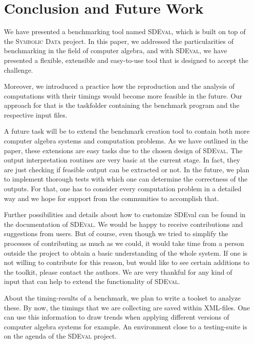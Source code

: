 \documentclass[oribibl,11pt]{article}
\begin{document}
\section{Conclusion and Future Work}
\label{sctn:Conclusion}

We have presented a benchmarking tool named \textsc{SDEval}, which is
built on top of the \textsc{Symbolic Data} project. In this paper, we addressed the particularities of
benchmarking in the field of computer algebra, and with
\textsc{SDEval}, we have presented a flexible, extensible and
easy-to-use tool that is designed to accept the challenge.

Moreover, we introduced a practice how the reproduction and the
analysis of computations with their timings would become more feasible
in the future.  Our approach for that is the taskfolder containing the
benchmark program and the respective input files.

A future task will be to extend the benchmark creation tool to contain
both more computer algebra systems and computation problems. As we
have outlined in the paper, these extensions
are easy tasks due to the chosen design of \textsc{SDEval}.
The output interpretation
routines are very basic at the current stage. In fact, they are just
checking if feasible output can be extracted or not. In the future, we plan
to implement thorough tests with which one can determine the
correctness of the outputs. For that,
one has to consider every computation problem in a detailed way and we
hope for support from the communities to accomplish
that.

Further possibilities and details about how to customize SDEval can be found in the documentation of
\textsc{SDEval}. We would be happy to receive contributions and
suggestions from users.  But of course, even though we tried to simplify the processes of
contributing as much as we could, it would take time from a
person outside the project to obtain a basic understanding of the whole system.
If one is not willing to contribute for this reason, but would like to see certain
additions to the toolkit, please contact the authors. We are very
thankful for any kind of input that can help to extend the
functionality of \textsc{SDEval}.


About the timing-results of a benchmark, we plan to write a
toolset to analyze these. By now, the timings
that we are collecting  are
saved within \textsc{XML}-files. One can use this information to draw
trends when applying different versions of computer algebra systems
for example. An environment close to a testing-suite is on the
agenda of the \textsc{SDEval} project. 
\end{document}
